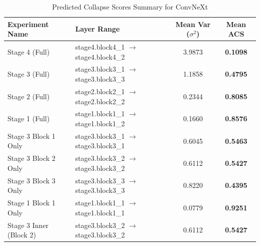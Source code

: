 \begin{table}[h]
\caption{Predicted Collapse Scores Summary for ConvNeXt}
\label{tab:acs_summary_convnext}
\begin{tabular}{llcc}
\toprule
Experiment Name & Layer Range & Mean Var ($\sigma^2$) & Mean ACS \\
\midrule
Stage 4 (Full) & stage4.block4\_1 $\to$ stage4.block4\_2 & 3.9873 & \textbf{0.1098} \\
Stage 3 (Full) & stage3.block3\_1 $\to$ stage3.block3\_3 & 1.1858 & \textbf{0.4795} \\
Stage 2 (Full) & stage2.block2\_1 $\to$ stage2.block2\_2 & 0.2344 & \textbf{0.8085} \\
Stage 1 (Full) & stage1.block1\_1 $\to$ stage1.block1\_2 & 0.1660 & \textbf{0.8576} \\
Stage 3 Block 1 Only & stage3.block3\_1 $\to$ stage3.block3\_1 & 0.6045 & \textbf{0.5463} \\
Stage 3 Block 2 Only & stage3.block3\_2 $\to$ stage3.block3\_2 & 0.6112 & \textbf{0.5427} \\
Stage 3 Block 3 Only & stage3.block3\_3 $\to$ stage3.block3\_3 & 0.8220 & \textbf{0.4395} \\
Stage 1 Block 1 Only & stage1.block1\_1 $\to$ stage1.block1\_1 & 0.0779 & \textbf{0.9251} \\
Stage 3 Inner (Block 2) & stage3.block3\_2 $\to$ stage3.block3\_2 & 0.6112 & \textbf{0.5427} \\
\bottomrule
\end{tabular}
\end{table}

